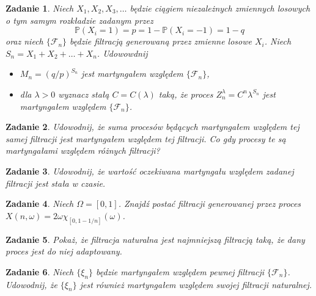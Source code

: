 \documentclass{mwart}
\newtheorem{zd}{Zadanie}
\begin{document}
\begin{zd}
Niech $X_1, X_2, X_3, \dots$ będzie ciągiem niezależnych zmiennych losowych o tym samym rozkładzie zadanym przez
\begin{displaymath}
\mathbb{P}\left(X_i = 1\right) = p = 1-\mathbb{P}\left(X_i = -1\right) = 1-q
\end{displaymath}
oraz niech $\{\mathcal{F}_n\}$ będzie filtracją generowaną przez zmienne losowe $X_i$. Niech $S_n = X_1 + X_2 + \dots +X_n$. Udowowdnij
\begin{itemize}
\item $M_n = \left(q/p\right)^{S_n}$ jest martyngałem względem $\{\mathcal{F}_n\}$,
\item dla $\lambda >0 $ wyznacz stałą $C = C(\lambda)$ taką, że proces $Z_n^{\lambda} = C^n\lambda^{S_n}$ jest martyngałem względem $\{\mathcal{F}_n\}$.
\end{itemize}
\end{zd}


\begin{zd}
Udowodnij, że suma procesów będących martyngałem względem tej samej filtracji jest martyngałem względem tej filtracji. Co gdy procesy te są martyngałami względem różnych filtracji?
\end{zd}

\begin{zd}
Udowodnij, że wartość oczekiwana martyngału względem zadanej filtracji jest stała w czasie.
\end{zd}

\begin{zd}
	Niech $\Omega = [0,1]$. Znajdź postać filtracji generowanej przez proces $X(n,\omega) = 2\omega \chi_{[0, 1 - 1/n]}(\omega)$.
\end{zd}

\begin{zd}
	Pokaż, że filtracja naturalna jest najmniejszą filtracją taką, że dany proces jest do niej adaptowany.
\end{zd}

\begin{zd}
	Niech $\{\xi_n\}$ będzie martyngałem względem pewnej filtracji $\{\mathcal{F}_n\}$. Udowodnij, że $\{\xi_n\}$ jest również martyngałem względem swojej filtracji naturalnej.
\end{zd}
\end{document}
